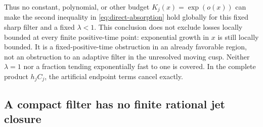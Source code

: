 \documentclass[11pt]{article}
\numberwithin{equation}{section}
\theoremstyle{definition}
\theoremstyle{remark}
\begin{document}
Thus no constant, polynomial, or other budget $K_j(x)=\exp(o(x))$
can make the second inequality in \eqref{eq:direct-absorption} hold
globally for this fixed sharp filter and a fixed $\lambda<1$.
This conclusion does not exclude losses locally bounded at every finite
positive-time point: exponential growth in $x$ is still locally bounded.
It is a fixed-positive-time obstruction in an already favorable region,
not an obstruction to an adaptive filter in the unresolved moving cusp.
Neither $\lambda=1$ nor a fraction tending exponentially fast to one is
covered. In the complete product $h_jC_j$, the artificial endpoint
terms cancel exactly.

\subsection{A compact filter has no finite rational jet closure}
\end{document}
